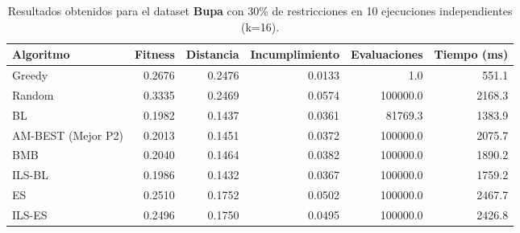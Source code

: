\begin{table}[H]
    \centering
    \begin{tabular}{lrrrrr}
        \hline
        Algoritmo & Fitness & Distancia & Incumplimiento & Evaluaciones & Tiempo (ms)\\
        \hline
        Greedy & 0.2676 & 0.2476 & 0.0133 & 1.0 & 551.1 \\
        Random & 0.3335 & 0.2469 & 0.0574 & 100000.0 & 2168.3 \\
        BL & 0.1982 & 0.1437 & 0.0361 & 81769.3 & 1383.9 \\
        AM-BEST (Mejor P2) & 0.2013 & 0.1451 & 0.0372 & 100000.0 & 2075.7 \\
        BMB & 0.2040 & 0.1464 & 0.0382 & 100000.0 & 1890.2 \\
        ILS-BL & 0.1986 & 0.1432 & 0.0367 & 100000.0 & 1759.2 \\
        ES & 0.2510 & 0.1752 & 0.0502 & 100000.0 & 2467.7 \\
        ILS-ES & 0.2496 & 0.1750 & 0.0495 & 100000.0 & 2426.8 \\
        \hline
    \end{tabular}
    \caption{Resultados obtenidos para el dataset \textbf{Bupa} con 30\% de restricciones en  10 ejecuciones independientes (k=16).}
    \label{tab:res_bupa_30}
\end{table}